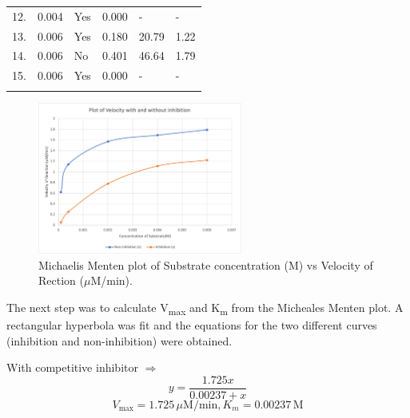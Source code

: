 \documentclass[pdflatex,sn-mathphys]{sn-jnl}%
\theoremstyle{thmstyleone}%
\theoremstyle{thmstyletwo}%
\theoremstyle{thmstylethree}%
\begin{document}
\begin{table}[h]
\begin{center}
\begin{minipage}{300pt}
\begin{tabular}{  m{4em}  m{4em} m{4.5em}  m{4.5em}  m{4.5em} m{4.5em}}
        12.         & 0.004           & Yes             & 0.000                     & -                                      & -                     \\
        13.         & 0.006           & Yes             & 0.180                     & 20.79                                  & 1.22                  \\
        14.         & 0.006           & No              & 0.401                     & 46.64                                  & 1.79                  \\
        15.         & 0.006           & Yes             & 0.000                     & -                                      & -                     \\
        \botrule
      \end{tabular}
    \end{minipage}
  \end{center}
\end{table}

\begin{figure}[h]
  \centering
  \includegraphics[width=0.6\textwidth]{photos/mm.png}
  \caption{Michaelis Menten plot of Substrate concentration (M) vs Velocity of Rection  ($\mu$M/min). }\label{fig3_1}
\end{figure}

The next step was to calculate V\textsubscript{max} and K\textsubscript{m} from
the Micheales Menten plot. A rectangular hyperbola was fit and the equations
for the two different curves (inhibition and non-inhibition) were obtained.

With competitive inhibitor $\Rightarrow$
\[y = \frac{1.725x}{0.00237 + x}\]
\[ V_{\text{max}} = 1.725\,\mu\text{M/min},  K_m = 0.00237\,\text{M}\]
\end{document}
